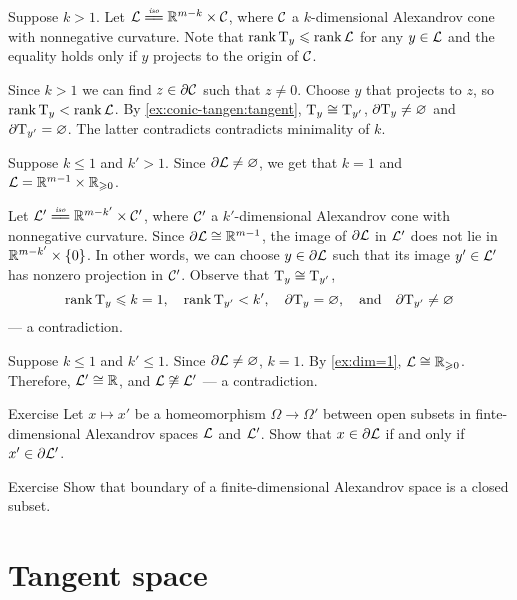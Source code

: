 Suppose $k>1$.
Let $\spc{L}\iso \RR^{m-k}\times \spc{C}$, where $\mathcal{C}$ a $k$-dimensional Alexandrov cone with nonnegative curvature.
Note that $\operatorname{\rm rank}\nolimits\mathrm{T}_y\leqslant\operatorname{\rm rank}\nolimits\mathcal{L}$ for any $y\in\mathcal{L}$ and the equality holds only if $y$ projects to the origin of $\mathcal{C}$.

Since $k>1$ we can find $z\in\partial\mathcal{C}$ such that $z\ne 0$.
Choose $y$ that projects to $z$, so $\operatorname{\rm rank}\nolimits\mathrm{T}_y<\operatorname{\rm rank}\nolimits\mathcal{L}$.
By \ref{ex:conic-tangen:tangent}, $\mathrm{T}_y\cong\mathrm{T}_{y'}$,
$\partial  \mathrm{T}_y\ne\varnothing$ and $\partial \mathrm{T}_{y'}=\varnothing$.
The latter contradicts contradicts minimality of $k$.

 Suppose $k\le1$ and $k'>1$.
Since $\partial \mathcal{L}\ne \varnothing$, we get that $k=1$ and $\mathcal{L}=\mathbb{R}^{m-1}\times\mathbb{R}_{\geqslant0}$.

Let $\spc{L}'\iso \RR^{m-k'}\times \spc{C}'$, where $\mathcal{C}'$ a $k'$-dimensional Alexandrov cone with nonnegative curvature.
Since $\partial\mathcal{L}\cong\mathbb{R}^{m-1}$,
the image of $\partial\mathcal{L}$ in $\mathcal{L}'$ does not lie in $\RR^{m-k'}\z\times\{0\}$.
In other words, we can choose $y\in \partial \mathcal{L}$ such that its image $y'\in \mathcal{L}'$ has nonzero projection in $\mathcal{C}'$.
Observe that $\mathrm{T}_y\cong\mathrm{T}_{y'}$,
\[
\operatorname{\rm rank}\nolimits\mathrm{T}_y\leqslant k=1,
\quad
\operatorname{\rm rank}\nolimits\mathrm{T}_{y'}< k',
\quad
\partial \mathrm{T}_y=\varnothing,
\quad\text{and}\quad
\partial \mathrm{T}_{y'}\ne \varnothing\]
--- a contradiction.

Suppose $k\le 1$ and $k'\le 1$.
Since $\partial \mathcal{L}\ne \varnothing$, $k=1$.
By \ref{ex:dim=1}, $\mathcal{L}\cong \mathbb{R}_{\geqslant0}$.
Therefore, $\mathcal{L}'\cong\mathbb{R}$, and $\mathcal{L}\not\cong\mathcal{L}'$ --- a contradiction.
\qeds

\begin{thm}{Exercise}\label{ex:bry2bry}
Let $x\mapsto x'$ be a homeomorphism $\Omega\to\Omega'$
between open subsets in finte-dimensional Alexandrov spaces $\mathcal{L}$ and $\mathcal{L}'$.
Show that $x\in \partial \mathcal{L}$ if and only if $x'\in \partial \mathcal{L}'$.

\end{thm}

\begin{thm}{Exercise}\label{ex:bry-closed}
Show that boundary of a finite-dimensional Alexandrov space is a closed subset.
\end{thm}

\section{Tangent space}

